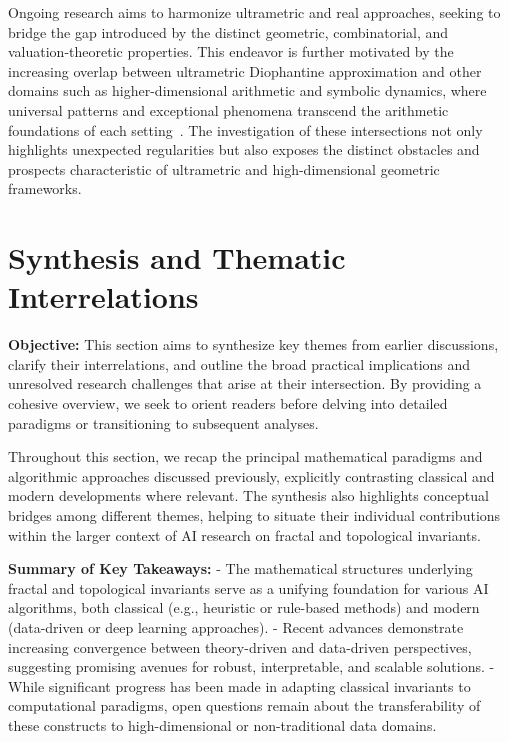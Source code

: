 \documentclass[sigconf]{acmart}
\begin{document}
Ongoing research aims to harmonize ultrametric and real approaches, seeking to bridge the gap introduced by the distinct geometric, combinatorial, and valuation-theoretic properties. This endeavor is further motivated by the increasing overlap between ultrametric Diophantine approximation and other domains such as higher-dimensional arithmetic and symbolic dynamics, where universal patterns and exceptional phenomena transcend the arithmetic foundations of each setting~\cite{ref79,ref109}. The investigation of these intersections not only highlights unexpected regularities but also exposes the distinct obstacles and prospects characteristic of ultrametric and high-dimensional geometric frameworks.

\section{Synthesis and Thematic Interrelations}

\textbf{Objective:} This section aims to synthesize key themes from earlier discussions, clarify their interrelations, and outline the broad practical implications and unresolved research challenges that arise at their intersection. By providing a cohesive overview, we seek to orient readers before delving into detailed paradigms or transitioning to subsequent analyses.

Throughout this section, we recap the principal mathematical paradigms and algorithmic approaches discussed previously, explicitly contrasting classical and modern developments where relevant. The synthesis also highlights conceptual bridges among different themes, helping to situate their individual contributions within the larger context of AI research on fractal and topological invariants.

\vspace{0.5em}

\textbf{Summary of Key Takeaways:}
- The mathematical structures underlying fractal and topological invariants serve as a unifying foundation for various AI algorithms, both classical (e.g., heuristic or rule-based methods) and modern (data-driven or deep learning approaches).
- Recent advances demonstrate increasing convergence between theory-driven and data-driven perspectives, suggesting promising avenues for robust, interpretable, and scalable solutions.
- While significant progress has been made in adapting classical invariants to computational paradigms, open questions remain about the transferability of these constructs to high-dimensional or non-traditional data domains.
\end{document}
